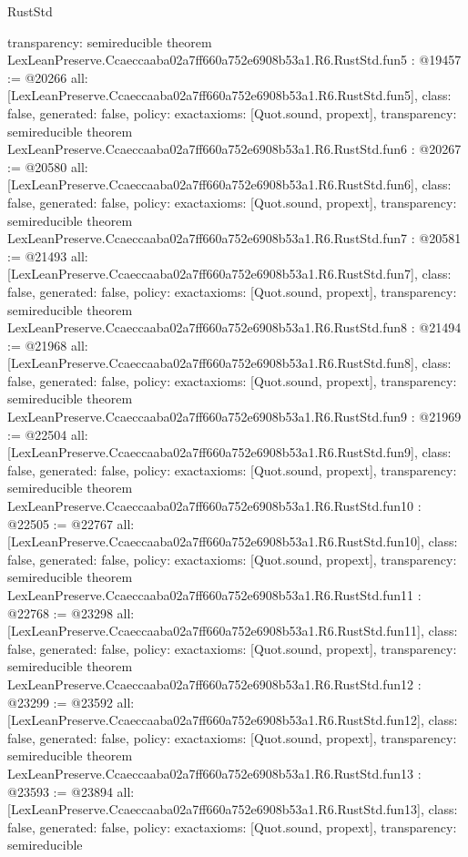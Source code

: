\begin{lexlean}{RustStd}
\begin{coremodule}
{  transparency: semireducible
}
theorem LexLeanPreserve.Ccaeccaaba02a7ff660a752e6908b53a1.R6.RustStd.fun5 : @19457 := @20266 {
  all: [LexLeanPreserve.Ccaeccaaba02a7ff660a752e6908b53a1.R6.RustStd.fun5],
  class: false,
  generated: false,
  policy: exact{axioms: [Quot.sound, propext]},
  transparency: semireducible
}
theorem LexLeanPreserve.Ccaeccaaba02a7ff660a752e6908b53a1.R6.RustStd.fun6 : @20267 := @20580 {
  all: [LexLeanPreserve.Ccaeccaaba02a7ff660a752e6908b53a1.R6.RustStd.fun6],
  class: false,
  generated: false,
  policy: exact{axioms: [Quot.sound, propext]},
  transparency: semireducible
}
theorem LexLeanPreserve.Ccaeccaaba02a7ff660a752e6908b53a1.R6.RustStd.fun7 : @20581 := @21493 {
  all: [LexLeanPreserve.Ccaeccaaba02a7ff660a752e6908b53a1.R6.RustStd.fun7],
  class: false,
  generated: false,
  policy: exact{axioms: [Quot.sound, propext]},
  transparency: semireducible
}
theorem LexLeanPreserve.Ccaeccaaba02a7ff660a752e6908b53a1.R6.RustStd.fun8 : @21494 := @21968 {
  all: [LexLeanPreserve.Ccaeccaaba02a7ff660a752e6908b53a1.R6.RustStd.fun8],
  class: false,
  generated: false,
  policy: exact{axioms: [Quot.sound, propext]},
  transparency: semireducible
}
theorem LexLeanPreserve.Ccaeccaaba02a7ff660a752e6908b53a1.R6.RustStd.fun9 : @21969 := @22504 {
  all: [LexLeanPreserve.Ccaeccaaba02a7ff660a752e6908b53a1.R6.RustStd.fun9],
  class: false,
  generated: false,
  policy: exact{axioms: [Quot.sound, propext]},
  transparency: semireducible
}
theorem LexLeanPreserve.Ccaeccaaba02a7ff660a752e6908b53a1.R6.RustStd.fun10 : @22505 := @22767 {
  all: [LexLeanPreserve.Ccaeccaaba02a7ff660a752e6908b53a1.R6.RustStd.fun10],
  class: false,
  generated: false,
  policy: exact{axioms: [Quot.sound, propext]},
  transparency: semireducible
}
theorem LexLeanPreserve.Ccaeccaaba02a7ff660a752e6908b53a1.R6.RustStd.fun11 : @22768 := @23298 {
  all: [LexLeanPreserve.Ccaeccaaba02a7ff660a752e6908b53a1.R6.RustStd.fun11],
  class: false,
  generated: false,
  policy: exact{axioms: [Quot.sound, propext]},
  transparency: semireducible
}
theorem LexLeanPreserve.Ccaeccaaba02a7ff660a752e6908b53a1.R6.RustStd.fun12 : @23299 := @23592 {
  all: [LexLeanPreserve.Ccaeccaaba02a7ff660a752e6908b53a1.R6.RustStd.fun12],
  class: false,
  generated: false,
  policy: exact{axioms: [Quot.sound, propext]},
  transparency: semireducible
}
theorem LexLeanPreserve.Ccaeccaaba02a7ff660a752e6908b53a1.R6.RustStd.fun13 : @23593 := @23894 {
  all: [LexLeanPreserve.Ccaeccaaba02a7ff660a752e6908b53a1.R6.RustStd.fun13],
  class: false,
  generated: false,
  policy: exact{axioms: [Quot.sound, propext]},
  transparency: semireducible
}
\end{coremodule}
\end{lexlean}
